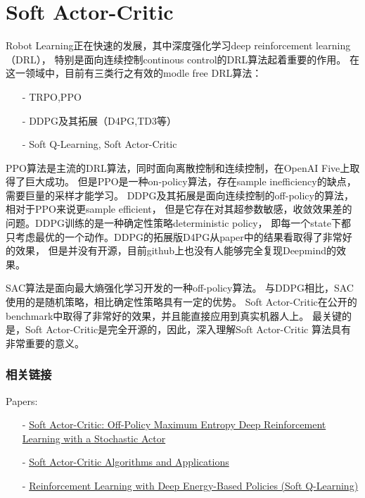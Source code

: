 ﻿\chapter{Soft Actor-Critic}


Robot Learning正在快速的发展，其中深度强化学习deep reinforcement learning（DRL），
特别是面向连续控制continous control的DRL算法起着重要的作用。
在这一领域中，目前有三类行之有效的modle free DRL算法：
\begin{itemize}
\setlength{\parskip}{0pt}
\item[-]
TRPO,PPO
\item[-]
DDPG及其拓展（D4PG,TD3等）
\item[-]
Soft Q-Learning, Soft Actor-Critic
\end{itemize}


PPO算法是主流的DRL算法，同时面向离散控制和连续控制，在OpenAI Five上取得了巨大成功。
但是PPO是一种on-policy算法，存在sample inefficiency的缺点，需要巨量的采样才能学习。
DDPG及其拓展是面向连续控制的off-policy的算法，相对于PPO来说更sample efficient，
但是它存在对其超参数敏感，收敛效果差的问题。DDPG训练的是一种确定性策略deterministic policy，
即每一个state下都只考虑最优的一个动作。DDPG的拓展版D4PG从paper中的结果看取得了非常好的效果，
但是并没有开源，目前github上也没有人能够完全复现Deepmind的效果。

SAC算法是面向最大熵强化学习开发的一种off-policy算法。
与DDPG相比，SAC使用的是随机策略，相比确定性策略具有一定的优势。
Soft Actor-Critic在公开的benchmark中取得了非常好的效果，并且能直接应用到真实机器人上。
最关键的是，Soft Actor-Critic是完全开源的，因此，深入理解Soft Actor-Critic 算法具有非常重要的意义。

\subsection{相关链接}

Papers:
\begin{itemize}
\setlength{\parskip}{0pt}
\item[-]
\href{https://arxiv.org/abs/1801.01290}{Soft Actor-Critic: 
Off-Policy Maximum Entropy Deep Reinforcement Learning with a Stochastic Actor}
\item[-]
\href{https://arxiv.org/abs/1812.05905}{Soft Actor-Critic Algorithms and Applications}
\item[-]
\href{https://arxiv.org/abs/1702.08165}{Reinforcement Learning with Deep Energy-Based Policies (Soft Q-Learning)}
\end{itemize}

